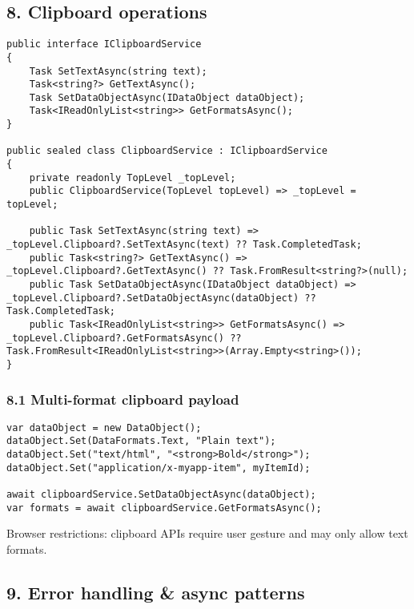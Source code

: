 \subsection{8. Clipboard operations}\label{clipboard-operations}

\begin{lstlisting}
public interface IClipboardService
{
    Task SetTextAsync(string text);
    Task<string?> GetTextAsync();
    Task SetDataObjectAsync(IDataObject dataObject);
    Task<IReadOnlyList<string>> GetFormatsAsync();
}

public sealed class ClipboardService : IClipboardService
{
    private readonly TopLevel _topLevel;
    public ClipboardService(TopLevel topLevel) => _topLevel = topLevel;

    public Task SetTextAsync(string text) => _topLevel.Clipboard?.SetTextAsync(text) ?? Task.CompletedTask;
    public Task<string?> GetTextAsync() => _topLevel.Clipboard?.GetTextAsync() ?? Task.FromResult<string?>(null);
    public Task SetDataObjectAsync(IDataObject dataObject) => _topLevel.Clipboard?.SetDataObjectAsync(dataObject) ?? Task.CompletedTask;
    public Task<IReadOnlyList<string>> GetFormatsAsync() => _topLevel.Clipboard?.GetFormatsAsync() ?? Task.FromResult<IReadOnlyList<string>>(Array.Empty<string>());
}
\end{lstlisting}

\subsubsection{8.1 Multi-format clipboard
payload}\label{multi-format-clipboard-payload}

\begin{lstlisting}
var dataObject = new DataObject();
dataObject.Set(DataFormats.Text, "Plain text");
dataObject.Set("text/html", "<strong>Bold</strong>");
dataObject.Set("application/x-myapp-item", myItemId);

await clipboardService.SetDataObjectAsync(dataObject);
var formats = await clipboardService.GetFormatsAsync();
\end{lstlisting}

Browser restrictions: clipboard APIs require user gesture and may only
allow text formats.

\subsection{9. Error handling \& async
patterns}\label{error-handling-async-patterns}

